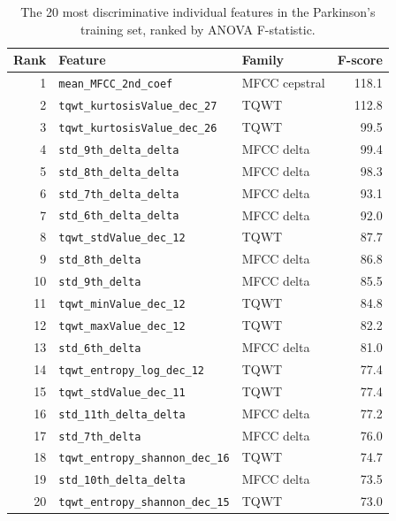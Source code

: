 \documentclass[11pt,a4paper]{article}
\begin{document}
\begin{table}[H]
    \centering
    \caption{The 20 most discriminative individual features in the
    Parkinson's training set, ranked by ANOVA F-statistic.}
    \label{tab:pd_top_features}
    \begin{tabular}{rllr}
        \toprule
        Rank & Feature & Family & F-score \\
        \midrule
         1 & \texttt{mean\_MFCC\_2nd\_coef}           & MFCC cepstral & 118.1 \\
         2 & \texttt{tqwt\_kurtosisValue\_dec\_27}    & TQWT          & 112.8 \\
         3 & \texttt{tqwt\_kurtosisValue\_dec\_26}    & TQWT          &  99.5 \\
         4 & \texttt{std\_9th\_delta\_delta}          & MFCC delta    &  99.4 \\
         5 & \texttt{std\_8th\_delta\_delta}          & MFCC delta    &  98.3 \\
         6 & \texttt{std\_7th\_delta\_delta}          & MFCC delta    &  93.1 \\
         7 & \texttt{std\_6th\_delta\_delta}          & MFCC delta    &  92.0 \\
         8 & \texttt{tqwt\_stdValue\_dec\_12}         & TQWT          &  87.7 \\
         9 & \texttt{std\_8th\_delta}                 & MFCC delta    &  86.8 \\
        10 & \texttt{std\_9th\_delta}                 & MFCC delta    &  85.5 \\
        11 & \texttt{tqwt\_minValue\_dec\_12}         & TQWT          &  84.8 \\
        12 & \texttt{tqwt\_maxValue\_dec\_12}         & TQWT          &  82.2 \\
        13 & \texttt{std\_6th\_delta}                 & MFCC delta    &  81.0 \\
        14 & \texttt{tqwt\_entropy\_log\_dec\_12}     & TQWT          &  77.4 \\
        15 & \texttt{tqwt\_stdValue\_dec\_11}         & TQWT          &  77.4 \\
        16 & \texttt{std\_11th\_delta\_delta}         & MFCC delta    &  77.2 \\
        17 & \texttt{std\_7th\_delta}                 & MFCC delta    &  76.0 \\
        18 & \texttt{tqwt\_entropy\_shannon\_dec\_16} & TQWT          &  74.7 \\
        19 & \texttt{std\_10th\_delta\_delta}         & MFCC delta    &  73.5 \\
        20 & \texttt{tqwt\_entropy\_shannon\_dec\_15} & TQWT          &  73.0 \\
        \bottomrule
    \end{tabular}
\end{table}
\end{document}
